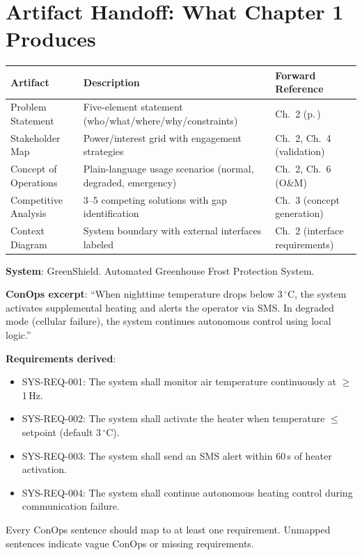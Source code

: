 \documentclass[11pt,letterpaper,twoside,openany]{book}
\newcommand{\degC}{\ensuremath{{}^{\circ}\text{C}}}
\begin{document}
\section{Artifact Handoff: What Chapter 1 Produces}
\begin{table}[htbp]\centering\small
\begin{tabularx}{\textwidth}{l X l}
\toprule
\textbf{Artifact} & \textbf{Description} & \textbf{Forward Reference} \\
\midrule
Problem Statement & Five-element statement (who/what/where/why/constraints) & Ch.~2 (p.\,\pageref{ch:value}) \\
Stakeholder Map & Power/interest grid with engagement strategies & Ch.~2, Ch.~4 (validation) \\
Concept of Operations & Plain-language usage scenarios (normal, degraded, emergency) & Ch.~2, Ch.~6 (O\&M) \\
Competitive Analysis & 3--5 competing solutions with gap identification & Ch.~3 (concept generation) \\
Context Diagram & System boundary with external interfaces labeled & Ch.~2 (interface requirements) \\
\bottomrule
\end{tabularx}
\end{table}


\begin{greenshieldbox}
\textbf{System}: GreenShield. Automated Greenhouse Frost Protection System.

\textbf{ConOps excerpt}: ``When nighttime temperature drops below 3\,\degC{}, the system activates supplemental heating and alerts the operator via SMS. In degraded mode (cellular failure), the system continues autonomous control using local logic.''

\textbf{Requirements derived}:
\begin{itemize}[nosep,leftmargin=1.5em]
\item SYS-REQ-001: The system shall monitor air temperature continuously at $\geq$1\,Hz.
\item SYS-REQ-002: The system shall activate the heater when temperature $\leq$ setpoint (default 3\,\degC{}).
\item SYS-REQ-003: The system shall send an SMS alert within 60\,s of heater activation.
\item SYS-REQ-004: The system shall continue autonomous heating control during communication failure.
\end{itemize}
Every ConOps sentence should map to at least one requirement. Unmapped sentences indicate vague ConOps or missing requirements.
\end{greenshieldbox}
\end{document}
